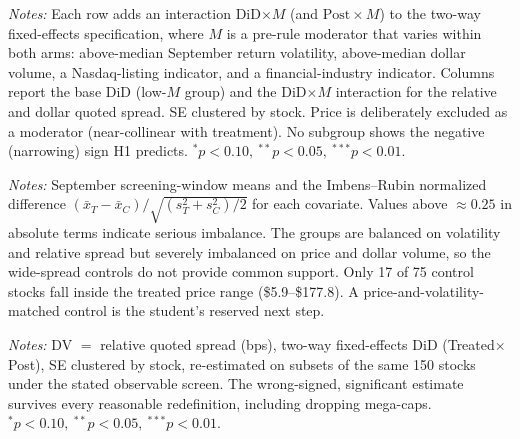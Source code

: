 \documentclass[12pt]{article}
\begin{document}
\begin{table}[htbp]\centering
\begin{threeparttable}
\caption{Heterogeneity of the DiD by observable pre-rule moderators}\label{tab:hetero}
\small

\begin{tablenotes}\small
\item \textit{Notes:} Each row adds an interaction DiD$\times M$ (and $\text{Post}\times M$) to
the two-way fixed-effects specification, where $M$ is a pre-rule moderator that varies within
both arms: above-median September return volatility, above-median dollar volume, a
Nasdaq-listing indicator, and a financial-industry indicator. Columns report the base DiD
(low-$M$ group) and the DiD$\times M$ interaction for the relative and dollar quoted spread. SE
clustered by stock. Price is deliberately excluded as a moderator (near-collinear with
treatment). No subgroup shows the negative (narrowing) sign H1 predicts.
$^{*}p<0.10,\ ^{**}p<0.05,\ ^{***}p<0.01$.
\end{tablenotes}
\end{threeparttable}
\end{table}

\begin{table}[htbp]\centering
\begin{threeparttable}
\caption{Covariate overlap: normalized differences (treated vs.\ control)}\label{tab:overlap}
\small

\begin{tablenotes}\small
\item \textit{Notes:} September screening-window means and the Imbens--Rubin normalized
difference $(\bar x_T-\bar x_C)/\sqrt{(s_T^2+s_C^2)/2}$ for each covariate. Values above
$\approx0.25$ in absolute terms indicate serious imbalance. The groups are balanced on
volatility and relative spread but severely imbalanced on price and dollar volume, so the
wide-spread controls do not provide common support. Only 17 of 75 control stocks fall inside the
treated price range (\$5.9--\$177.8). A price-and-volatility-matched control is the student's
reserved next step.
\end{tablenotes}
\end{threeparttable}
\end{table}

\begin{table}[htbp]\centering
\begin{threeparttable}
\caption{The DiD under alternative screen definitions}\label{tab:altdef}
\small

\begin{tablenotes}\small
\item \textit{Notes:} DV $=$ relative quoted spread (bps), two-way fixed-effects DiD
(Treated$\times$Post), SE clustered by stock, re-estimated on subsets of the same 150 stocks
under the stated observable screen. The wrong-signed, significant estimate survives every
reasonable redefinition, including dropping mega-caps. $^{*}p<0.10,\ ^{**}p<0.05,\ ^{***}p<0.01$.
\end{tablenotes}
\end{threeparttable}
\end{table}
\end{document}
